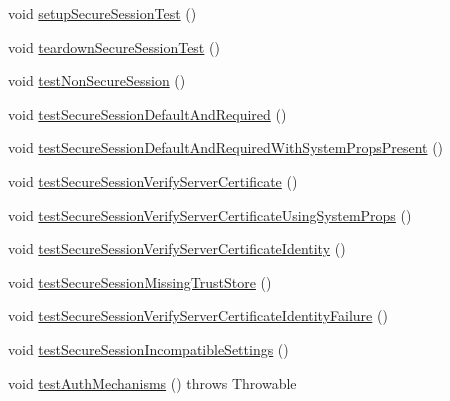 \begin{DoxyCompactItemize}
\item 
void \mbox{\hyperlink{classtestsuite_1_1x_1_1devapi_1_1_secure_session_test_a531c9ad1af18dfd3fd69ac42d16c8763}{setup\+Secure\+Session\+Test}} ()
\item 
void \mbox{\hyperlink{classtestsuite_1_1x_1_1devapi_1_1_secure_session_test_a7d598e38db5228b2bd1d4e54ad13b8aa}{teardown\+Secure\+Session\+Test}} ()
\item 
void \mbox{\hyperlink{classtestsuite_1_1x_1_1devapi_1_1_secure_session_test_a76ccf1c3aa50c554feb81ea94f045f10}{test\+Non\+Secure\+Session}} ()
\item 
void \mbox{\hyperlink{classtestsuite_1_1x_1_1devapi_1_1_secure_session_test_a5339a158249ecdd744cbbca9baba9831}{test\+Secure\+Session\+Default\+And\+Required}} ()
\item 
void \mbox{\hyperlink{classtestsuite_1_1x_1_1devapi_1_1_secure_session_test_aed029a480742775392f0eea63e983b75}{test\+Secure\+Session\+Default\+And\+Required\+With\+System\+Props\+Present}} ()
\item 
void \mbox{\hyperlink{classtestsuite_1_1x_1_1devapi_1_1_secure_session_test_a36e8f659ede8006469fcc4821f8b9c7f}{test\+Secure\+Session\+Verify\+Server\+Certificate}} ()
\item 
void \mbox{\hyperlink{classtestsuite_1_1x_1_1devapi_1_1_secure_session_test_a770903a4a44c09acce0868ce8fbeb167}{test\+Secure\+Session\+Verify\+Server\+Certificate\+Using\+System\+Props}} ()
\item 
void \mbox{\hyperlink{classtestsuite_1_1x_1_1devapi_1_1_secure_session_test_a13ab9c1584ea928054cec28d5c1157e1}{test\+Secure\+Session\+Verify\+Server\+Certificate\+Identity}} ()
\item 
void \mbox{\hyperlink{classtestsuite_1_1x_1_1devapi_1_1_secure_session_test_aae0c8809c0ecd1323484109112fc2fc1}{test\+Secure\+Session\+Missing\+Trust\+Store}} ()
\item 
void \mbox{\hyperlink{classtestsuite_1_1x_1_1devapi_1_1_secure_session_test_a92a3f1a5a9c4a0f49b26b8eef7bcf1c2}{test\+Secure\+Session\+Verify\+Server\+Certificate\+Identity\+Failure}} ()
\item 
void \mbox{\hyperlink{classtestsuite_1_1x_1_1devapi_1_1_secure_session_test_a7cc008292c6b4678f2354b207f0ce30b}{test\+Secure\+Session\+Incompatible\+Settings}} ()
\item 
void \mbox{\hyperlink{classtestsuite_1_1x_1_1devapi_1_1_secure_session_test_a8d3f3c54a0170233b5c1fc60dc14e163}{test\+Auth\+Mechanisms}} ()  throws Throwable 

\end{DoxyCompactItemize}
